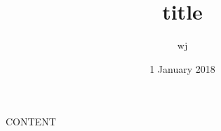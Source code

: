 \documentclass[12pt]{slides}
\begin{document}
\title{title}
\author{wj}
\date{1 January 2018}
\maketitle

CONTENT
\end{document}
